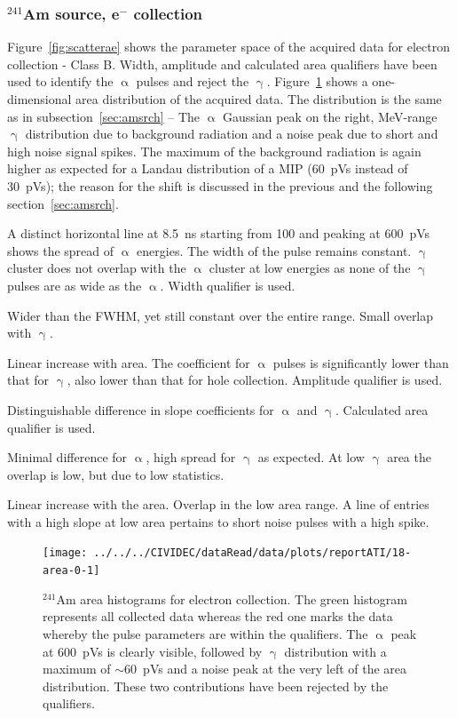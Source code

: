 \subsubsection{$^{241}$Am source, e$^-$ collection}
\label{sec:amsrce}
Figure~\ref{fig:scatterae} shows the parameter space of the acquired data for electron collection - Class B. Width, amplitude and calculated area qualifiers have been used to identify the $\upalpha$ pulses and reject the $\upgamma$. Figure~\ref{fig:1dalphaareae} shows a one-dimensional area distribution of the acquired data. The distribution is the same as in subsection~\ref{sec:amsrch} -- The $\upalpha$ Gaussian peak on the right, MeV-range $\upgamma$ distribution due to background radiation and a noise peak due to short and high noise signal spikes. 
The maximum of the background radiation is again higher as expected for a Landau distribution of a MIP (60~pVs instead of 30~pVs); the reason for the shift is discussed in the previous and the following section~\ref{sec:amsrch}.
\begin{description}
\setlength\itemsep{-0.3em}
\item[Width: ] A distinct horizontal line at 8.5~ns starting from 100 and peaking at 600~pVs shows the spread of $\upalpha$ energies. The width of the pulse remains constant. $\upgamma$ cluster does not overlap with the $\upalpha$ cluster at low energies as none of the $\upgamma$ pulses are as wide as the $\upalpha$. Width qualifier is used.
\item[Base width: ] Wider than the FWHM, yet still constant over the entire range. Small overlap with $\upgamma$.
\item[Amplitude: ] Linear increase with area. The coefficient for $\upalpha$ pulses is significantly lower than that for $\upgamma$, also lower than that for hole collection. Amplitude qualifier is used.
\item[Calculated area: ] Distinguishable difference in slope coefficients for $\upalpha$ and $\upgamma$. Calculated area qualifier is used.
\item[Base width -- width: ] Minimal difference for $\upalpha$, high spread for $\upgamma$ as expected. At low $\upgamma$ area the overlap is low, but due to low statistics.
\item[Slope: ] Linear increase with the area. Overlap in the low area range. A line of entries with a high slope at low area pertains to short noise pulses with a high spike.
\end{description}

\begin{figure}[]
\centering
\texttt{[image: ../../../CIVIDEC/dataRead/data/plots/reportATI/18-area-0-1]}
\caption{$^{241}$Am area histograms for electron collection. The green histogram represents all collected data whereas the red one marks the data whereby the pulse parameters are within the qualifiers. The $\upalpha$ peak at 600~pVs is clearly visible, followed by $\upgamma$ distribution with a maximum of $\sim$60~pVs and a noise peak at the very left of the area distribution. These two contributions have been rejected by the qualifiers.}
\label{fig:1dalphaareae}
\end{figure}




